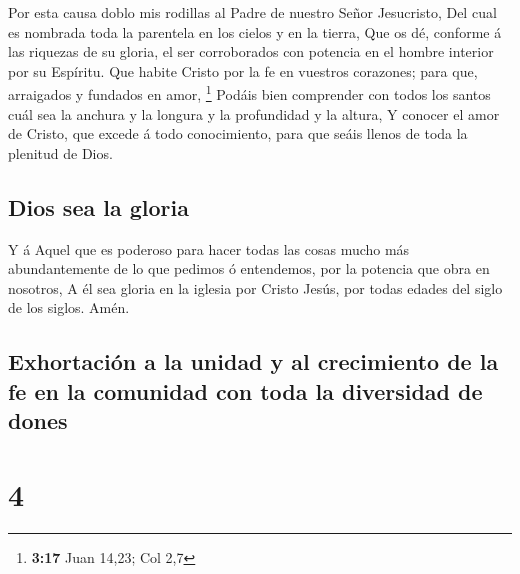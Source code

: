  Por esta causa doblo mis rodillas al Padre de nuestro
Señor Jesucristo,  Del cual es nombrada toda la parentela
en los cielos y en la tierra,  Que os dé, conforme á las
riquezas de su gloria, el ser corroborados con potencia en el hombre
interior por su Espíritu.  Que habite Cristo por la fe en
vuestros corazones; para que, arraigados y fundados en amor, \footnote{\textbf{3:17}
  Juan 14,23; Col 2,7}  Podáis bien comprender con todos
los santos cuál sea la anchura y la longura y la profundidad y la
altura,  Y conocer el amor de Cristo, que excede á todo
conocimiento, para que seáis llenos de toda la plenitud de Dios.

\hypertarget{dios-sea-la-gloria}{%
\subsection{Dios sea la gloria}\label{dios-sea-la-gloria}}

 Y á Aquel que es poderoso para hacer todas las cosas mucho
más abundantemente de lo que pedimos ó entendemos, por la potencia que
obra en nosotros,  A él sea gloria en la iglesia por Cristo
Jesús, por todas edades del siglo de los siglos. Amén.

\hypertarget{exhortaciuxf3n-a-la-unidad-y-al-crecimiento-de-la-fe-en-la-comunidad-con-toda-la-diversidad-de-dones}{%
\subsection{Exhortación a la unidad y al crecimiento de la fe en la
comunidad con toda la diversidad de
dones}\label{exhortaciuxf3n-a-la-unidad-y-al-crecimiento-de-la-fe-en-la-comunidad-con-toda-la-diversidad-de-dones}}

\hypertarget{section-3}{%
\section{4}\label{section-3}}


